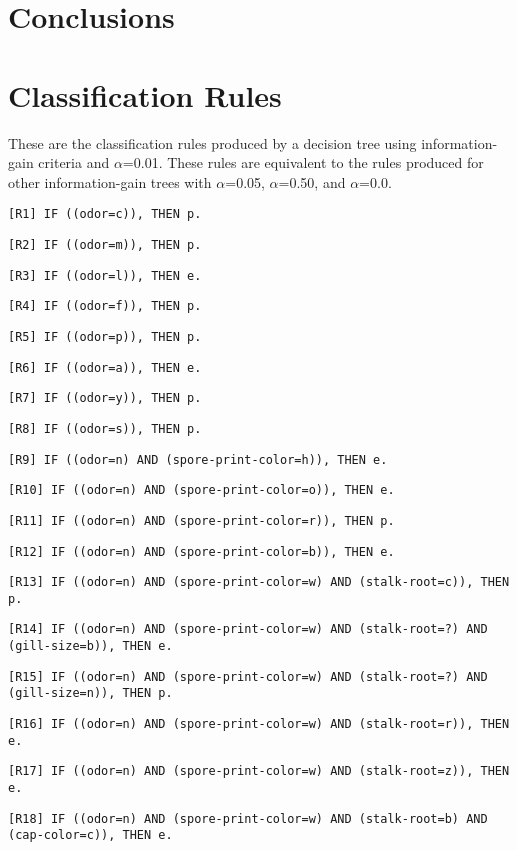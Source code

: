 \documentclass{IEEEtran}
\begin{document}
\section{Conclusions}

\printbibliography

\newpage
\appendix
\section{ Classification Rules}
These are the classification rules produced by a decision tree using
information-gain criteria and $\alpha$=0.01. These rules are equivalent to
the rules produced for other information-gain trees with $\alpha$=0.05,
$\alpha$=0.50, and $\alpha$=0.0.

\texttt{[R1] IF ((odor=c)), THEN p.}

\texttt{[R2] IF ((odor=m)), THEN p.}

\texttt{[R3] IF ((odor=l)), THEN e.}

\texttt{[R4] IF ((odor=f)), THEN p.}

\texttt{[R5] IF ((odor=p)), THEN p.}

\texttt{[R6] IF ((odor=a)), THEN e.}

\texttt{[R7] IF ((odor=y)), THEN p.}

\texttt{[R8] IF ((odor=s)), THEN p.}

\texttt{[R9] IF ((odor=n) AND (spore-print-color=h)), THEN e.}

\texttt{[R10] IF ((odor=n) AND (spore-print-color=o)), THEN e.}

\texttt{[R11] IF ((odor=n) AND (spore-print-color=r)), THEN p.}

\texttt{[R12] IF ((odor=n) AND (spore-print-color=b)), THEN e.}

\texttt{[R13] IF ((odor=n) AND (spore-print-color=w) AND
  (stalk-root=c)), THEN p.}

\texttt{[R14] IF ((odor=n) AND (spore-print-color=w) AND (stalk-root=?)
  AND (gill-size=b)), THEN e.}

\texttt{[R15] IF ((odor=n) AND (spore-print-color=w) AND (stalk-root=?)
  AND (gill-size=n)), THEN p.}

\texttt{[R16] IF ((odor=n) AND (spore-print-color=w) AND
  (stalk-root=r)), THEN e.}

\texttt{[R17] IF ((odor=n) AND (spore-print-color=w) AND (stalk-root=z)), THEN
e.}

\texttt{[R18] IF ((odor=n) AND (spore-print-color=w) AND (stalk-root=b) AND
(cap-color=c)), THEN e.}
\end{document}
